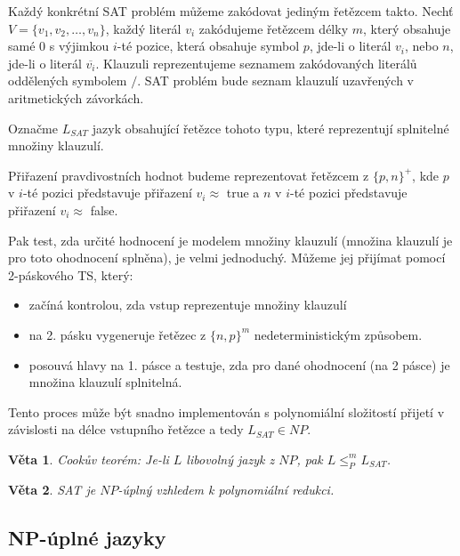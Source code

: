 \documentclass[a4paper, 11pt]{report}
\newtheorem{veta}{Věta}[chapter]
\begin{document}
Každý konkrétní SAT problém můžeme zakódovat jediným řetězcem takto. Nechť $V = \{v_1, v_2, \dots, v_n\}$, každý literál $v_i$ zakódujeme řetězcem délky $m$, který obsahuje samé 0 s výjimkou $i$-té pozice, která obsahuje symbol $p$, jde-li o literál $v_i$, nebo $n$, jde-li o literál $\overline{v_i}$. Klauzuli reprezentujeme seznamem zakódovaných literálů oddělených symbolem $/$. SAT problém bude seznam klauzulí uzavřených v aritmetických závorkách.

Označme $L_{SAT}$ jazyk obsahující řetězce tohoto typu, které reprezentují splnitelné množiny klauzulí.

Přiřazení pravdivostních hodnot budeme reprezentovat řetězcem z $\{p, n\}^+$, kde $p$ v $i$-té pozici představuje přiřazení $v_i \approx $ true a $n$ v $i$-té pozici představuje přiřazení $v_i \approx $ false.

Pak test, zda určité hodnocení je modelem množiny klauzulí (množina klauzulí je pro toto ohodnocení splněna), je velmi jednoduchý. Můžeme jej přijímat pomocí 2-páskového TS, který:
\begin{itemize}
	\item začíná kontrolou, zda vstup reprezentuje množiny klauzulí
	\item na 2. pásku vygeneruje řetězec z $\{n,p\}^m$ nedeterministickým způsobem.
	\item posouvá hlavy na 1. pásce a testuje, zda pro dané ohodnocení (na 2 pásce) je množina klauzulí splnitelná.
\end{itemize}
Tento proces může být snadno implementován s polynomiální složitostí přijetí v závislosti na délce vstupního řetězce a tedy $L_{SAT} \in NP$.

\begin{veta}
Cookův teorém: Je-li $L$ libovolný jazyk z $NP$, pak $L \leq_P^m L_{SAT}$.
\end{veta}

\begin{veta}
SAT je $NP$-úplný vzhledem k polynomiální redukci.
\end{veta}

\subsection{NP-úplné jazyky}
\end{document}

